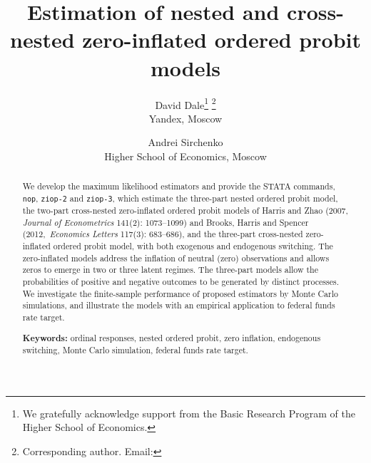\documentclass[letterpaper,fleqn,12pt]{article}
\begin{document}
\title{Estimation of nested and cross-nested zero-inflated ordered probit
models\\
\bigskip }
\date{}
\author{David Dale\thanks{%
We gratefully acknowledge support from the Basic Research Program of the
Higher School of Economics.} \thanks{%
Corresponding author. Email:} \\
Yandex, Moscow \and Andrei Sirchenko \\
Higher School of Economics, Moscow}
\maketitle

\begin{abstract}
We develop the maximum likelihood estimators and provide the STATA commands, 
\texttt{nop}, \texttt{ziop-2} and \texttt{ziop-3}, which estimate the
three-part nested ordered probit model, the two-part cross-nested
zero-inflated ordered probit models of Harris and Zhao (2007, \textit{%
Journal of Econometrics }141(2): 1073--1099) and Brooks, Harris and Spencer
(2012,\ \textit{Economics Letters} 117(3): 683--686), and the three-part
cross-nested zero-inflated ordered probit model, with both exogenous and
endogenous switching. The zero-inflated models address the inflation of
neutral (zero) observations and allows zeros to emerge in two or three
latent regimes. The three-part models allow the probabilities of positive
and negative outcomes to be generated by distinct processes. We investigate
the finite-sample performance of proposed estimators by Monte Carlo
simulations, and illustrate the models with an empirical application to
federal funds rate target.

\bigskip \bigskip \bigskip \bigskip \bigskip \bigskip \bigskip 

\bigskip \bigskip \bigskip \bigskip \bigskip \bigskip \bigskip 

\bigskip \bigskip \bigskip \bigskip \bigskip \bigskip \bigskip 

\textbf{Keywords:} ordinal responses, nested ordered probit, zero inflation,
endogenous switching, Monte Carlo simulation, federal funds rate target.

\bigskip \bigskip \bigskip \bigskip \bigskip
\end{abstract}
\end{document}
